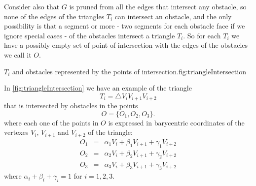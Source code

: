 \documentclass[dissertation.tex]{subfiles}
\begin{document}
Consider also that $G$ is pruned from all the edges that intersect any
obstacle, so none of the edges of the triangles $T_i$ can intersect
an obstacle, and the only possibility is that a segment or more - two
segments for each obstacle face if we ignore special cases - of the
obstacles intersect a
triangle $T_i$. So for each $T_i$ we have a possibly empty set of point
of intersection with the edges of the obstacles - we call it $O$.
\begin{myfig}{$T_i$ and obstacles
    represented by the points of intersection.}{fig:triangleIntersection}
\end{myfig}

In \cref{fig:triangleIntersection} we have an example of the triangle
\begin{equation*}
  T_i = \triangle V_iV_{i+1}V_{i+2} 
\end{equation*}
that is
intersected by obstacles in the points
\begin{equation*}
  O = \{O_1,O_2,O_3\}.
\end{equation*}
where each one of the points in $O$ is expressed in barycentric
coordinates of the vertexes $V_i$, $V_{i+1}$ and $V_{i+2}$ of the
triangle:
\begin{eqnarray*}
  O_1&=&\alpha_1 V_i+\beta_1 V_{i+1}+\gamma_1 V_{i+2}\\
  O_2&=&\alpha_2 V_i+\beta_2 V_{i+1}+\gamma_2 V_{i+2}\\
  O_3&=&\alpha_3 V_i+\beta_3 V_{i+1}+\gamma_3 V_{i+2}
\end{eqnarray*}
where $\alpha_i+\beta_i+\gamma_i=1$ for $i=1,2,3$.
\end{document}
